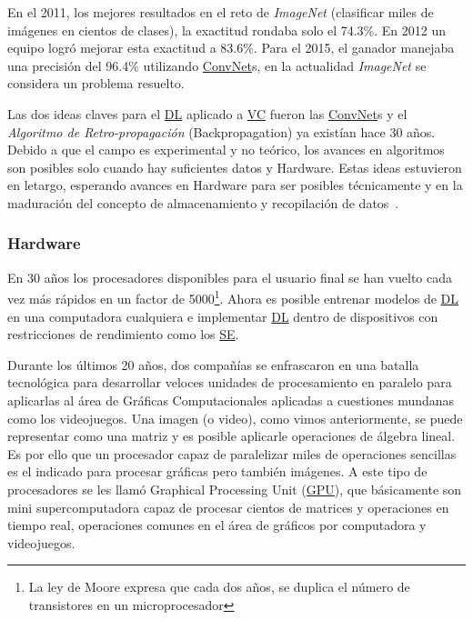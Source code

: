 En el 2011, los mejores resultados en el reto de \emph{ImageNet} (clasificar
miles de imágenes en cientos de clases), la exactitud rondaba solo el 74.3\%. En
2012 un equipo logró mejorar esta exactitud a 83.6\%. Para el 2015, el ganador
manejaba una precisión del 96.4\% utilizando \hyperlink{abbr}{ConvNet}s, en la
actualidad \emph{ImageNet} se considera un problema resuelto.

Las dos ideas claves para el \hyperlink{abbr}{DL} aplicado a
\hyperlink{abbr}{VC} fueron las \hyperlink{abbr}{ConvNet}s y el \emph{Algoritmo
de Retro-propagación} (Backpropagation) ya existían hace 30 años. Debido a que
el campo es experimental y no teórico, los avances en algoritmos son posibles
solo cuando hay suficientes datos y Hardware. Estas ideas estuvieron en letargo,
esperando avances en Hardware para ser posibles técnicamente y en la maduración
del concepto de almacenamiento y recopilación de datos~\cite{Chollet2018}.

\subsubsection{Hardware}

En 30 años los procesadores disponibles para el usuario final se han vuelto cada
vez más rápidos en un factor de 5000\footnote{La ley de Moore expresa que cada
dos años, se duplica el número de transistores en un microprocesador}. Ahora es
posible entrenar modelos de \hyperlink{abbr}{DL} en una computadora cualquiera e
implementar \hyperlink{abbr}{DL} dentro de dispositivos con restricciones de
rendimiento como los \hyperlink{abbr}{SE}.

Durante los últimos 20 años, dos compañías se enfrascaron en una batalla
tecnológica para desarrollar veloces unidades de procesamiento en paralelo para
aplicarlas al área de Gráficas Computacionales aplicadas a cuestiones mundanas
como los videojuegos. Una imagen (o video), como vimos anteriormente, se puede
representar como una matriz y es posible aplicarle operaciones de álgebra
lineal. Es por ello que un procesador capaz de paralelizar miles de operaciones
sencillas es el indicado para procesar gráficas pero también imágenes. A este
tipo de procesadores se les llamó Graphical Processing Unit
(\hyperlink{abbr}{GPU}), que
básicamente son mini supercomputadora capaz de procesar cientos de matrices y
operaciones en tiempo real, operaciones comunes en el área de gráficos por
computadora y videojuegos. 


